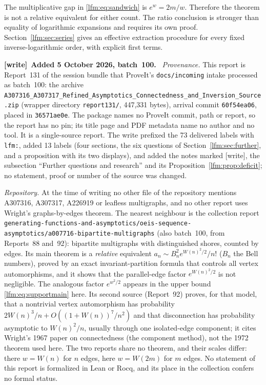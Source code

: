 \documentclass[11pt,letterpaper]{article}
\theoremstyle{remark}\newtheorem{remark}[theorem]{Remark}
\newenvironment{writenote}[1][]{\par\smallskip\begingroup\small
 \noindent\textbf{[write]}\if\relax\detokenize{#1}\relax\else~\textbf{#1.}\fi\ }%
 {\par\endgroup\smallskip}
\begin{document}
The multiplicative gap in \eqref{lfm:eq:sandwich} is $e^w=2m/w$. Therefore the theorem is not a relative equivalent for either count. The ratio conclusion is stronger than equality of logarithmic expansions and requires its own proof. Section~\ref{lfm:sec:series} gives an effective extraction procedure for every fixed inverse-logarithmic order, with explicit first terms.

\begin{writenote}[Added 5 October 2026, batch~100]
\emph{Provenance.} This report is Report~131 of the session bundle that
ProveIt's \nolinkurl{docs/incoming} intake processed as batch~100: the archive
\nolinkurl{A307316_A307317_Refined_Asymptotics_Connectedness_and_Inversion_Source.zip}
(wrapper directory \nolinkurl{report131/}, 447{,}331 bytes), arrival commit
\nolinkurl{60f54ea06}, placed in \nolinkurl{36571ae0e}. The package names no
ProveIt commit, path or report, so the report has no pin; its title page and
PDF metadata name no author and no tool. It is a single-source report. The
write prefixed the 73 delivered labels with \nolinkurl{lfm:}, added 13 labels
(four sections, the six questions of Section~\ref{lfm:sec:further}, and a
proposition with its two displays), and added the notes marked [write], the
subsection ``Further questions and research'' and its
Proposition~\ref{lfm:prop:deficit}; no statement, proof or number of the
source was changed.

\emph{Repository.} At the time of writing no other file of the repository
mentions A307316, A307317, A226919 or leafless multigraphs, and no other
report uses Wright's graphs-by-edges theorem. The nearest neighbour is the
collection report
\nolinkurl{generating-functions-and-asymptotics/oeis-sequence-asymptotics/a007716-bipartite-multigraphs}
(also batch~100, from Reports~88 and~92): bipartite multigraphs with
distinguished shores, counted by edges. Its main theorem is a
\emph{relative} equivalent $a_n\sim B_n^2e^{W(n)^2/2}/n!$ ($B_n$ the Bell
numbers), proved by an exact invariant-partition formula that controls all
vertex automorphisms, and it shows that the parallel-edge factor
$e^{W(n)^2/2}$ is not negligible. The analogous factor $e^{w^2/2}$ appears in
the upper bound \eqref{lfm:eq:supportmain} here. Its second source
(Report~92) proves, for that model, that a nontrivial vertex automorphism
has probability $2W(n)^3/n+O((1+W(n))^7/n^2)$ and that disconnection has
probability asymptotic to $W(n)^2/n$, usually through one isolated-edge
component; it cites Wright's 1967 paper on connectedness (the component
method), not the 1972 theorem used here. The two reports share no theorem,
and their scales differ: there $w=W(n)$ for $n$ edges, here $w=W(2m)$ for
$m$ edges. No statement of this report is formalized in Lean or
Rocq, and its place in the collection confers no formal status.


\end{writenote}
\end{document}
